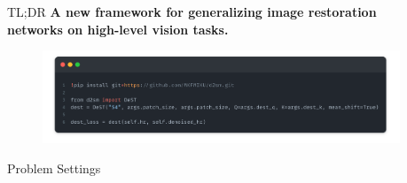 \documentclass[final]{beamer}
\newlength{\sepwidth}
\newlength{\colwidth}
\newcommand{\separatorcolumn}{\begin{column}{\sepwidth}\end{column}}
\begin{document}
\begin{frame}[t]
\begin{columns}[t]
\separatorcolumn

\begin{column}{\colwidth}

  \begin{block}{TL;DR}
  \textbf{A new framework for generalizing image restoration networks on high-level vision tasks.}
  \begin{figure}
      \centering
      \includegraphics[width=\linewidth]{contents/code.png}
  \end{figure}

  \end{block}

  \begin{block}{Problem Settings}


\end{block}
\end{column}
\end{columns}
\end{frame}
\end{document}
